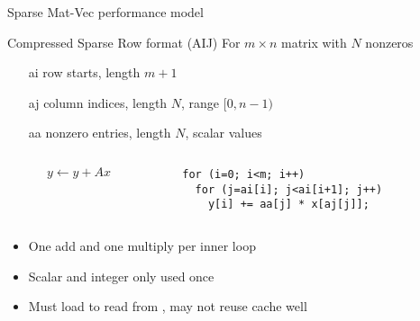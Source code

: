 \begin{frame}[fragile]{Sparse Mat-Vec performance model}
  \begin{block}{Compressed Sparse Row format (AIJ)}
    For $m \times n$ matrix with $N$ nonzeros
    \begin{itemize}
    \item[ai] row starts, length $m+1$
    \item[aj] column indices, length $N$, range $[0,n-1)$
    \item[aa] nonzero entries, length $N$, scalar values
    \end{itemize}
  \end{block}
\begin{columns}
\begin{column}{0.3\textwidth}
\[y \gets y + A x\]
\end{column}
\begin{column}{0.7\textwidth}
\begin{lstlisting}
  for (i=0; i<m; i++)
    for (j=ai[i]; j<ai[i+1]; j++)
      y[i] += aa[j] * x[aj[j]];
    \end{lstlisting}
  \end{column}
\end{columns}
  \begin{itemize}
  \item One add and one multiply per inner loop
  \item Scalar  and integer  only used once
  \item Must load  to read from , may not reuse cache well
  \end{itemize}
\end{frame}
